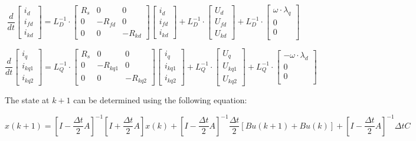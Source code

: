 \begin{equation}
\frac{d}{dt}
\begin{bmatrix}
i_d \\
i_{fd} \\
i_{kd}
\end{bmatrix}
=
L_D^{-1} \cdot
\begin{bmatrix}
R_s & 0 & 0 \\
0 & -R_{fd} & 0 \\
0 & 0 & -R_{kd} 
\end{bmatrix}
\begin{bmatrix}
i_d \\
i_{fd} \\
i_{kd}
\end{bmatrix}
+
L_D^{-1} \cdot
\begin{bmatrix}
U_d \\
U_{fd}\\
U_{kd}
\end{bmatrix}
+
L_D^{-1} \cdot
\begin{bmatrix}
\omega \cdot \lambda_q \\
0 \\
0 \\
\end{bmatrix}
\end{equation}

\begin{equation}
\frac{d}{dt}
\begin{bmatrix}
i_q \\
i_{kq1} \\
i_{kq2}
\end{bmatrix}
=
L_Q^{-1} \cdot
\begin{bmatrix}
R_s & 0 & 0 \\
0 & -R_{kq1} & 0 \\
0 & 0 & -R_{kq2} 
\end{bmatrix}
\begin{bmatrix}
i_q \\
i_{kq1} \\
i_{kq2}
\end{bmatrix}
+
L_Q^{-1} \cdot
\begin{bmatrix}
U_q \\
U_{kq1}\\
U_{kq2}
\end{bmatrix}
+
L_Q^{-1} \cdot
\begin{bmatrix}
-\omega \cdot \lambda_d \\
0 \\
0 \\
\end{bmatrix}
\end{equation}

The state at $k+1$ can be determined using the following equation:

\begin{equation}
x(k+1)  = [I - \frac{\Delta t}{2} A]^{-1}[I + \frac{\Delta t}{2} A] x(k) + [I - \frac{\Delta t}{2} A]^{-1}\frac{\Delta t}{2} [Bu(k+1) + Bu(k)] + [I - \frac{\Delta t}{2} A]^{-1} \Delta t C
\end{equation}
